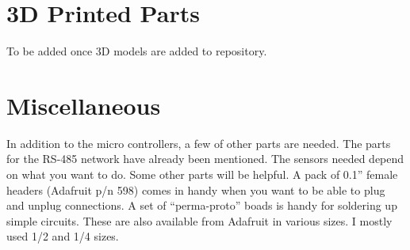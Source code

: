 \documentclass[10pt]{article}
\begin{document}
\section{3D Printed Parts}
To be added once 3D models are added to repository.

\section{Miscellaneous}
In addition to the micro controllers, a few of other parts are needed.  The parts for the RS-485 network have already been mentioned.  The sensors needed depend on what you want to do.  Some other parts will be helpful.  A pack of 0.1'' female headers (Adafruit p/n 598) comes in handy when you want to be able to plug and unplug connections.  A set of ``perma-proto'' boads is handy for soldering up simple circuits.  These are also available from Adafruit in various sizes.  I mostly used 1/2 and 1/4 sizes.
\end{document}
